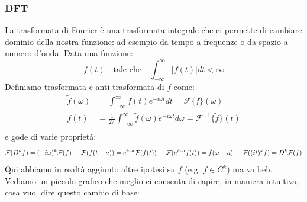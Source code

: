 \documentclass[10pt,a4paper]{article}
\begin{document}
\subsubsection{DFT}
La trasformata di Fourier è una trasformata integrale che ci  permette di cambiare dominio della nostra funzione: ad esempio da tempo a frequenze o da spazio a numero d'onda. Data una funzione:
\begin{equation}
f(t) \quad \text{tale che} \quad \int_{-\infty}^{\infty} |f(t)| dt < \infty
\end{equation}
Definiamo trasformata e anti trasformata di $f$ come:
\begin{align}
\tilde{f}(\omega) &= \int_{-\infty}^{\infty} f(t) e^{-i \omega t} dt = \mathcal{F}\{ f \}(\omega) \\
f(t) &= \frac{1}{2 \pi} \int_{-\infty}^{\infty} \tilde{f}(\omega) e^{-i \omega t} d \omega =  \mathcal{F}^{-1}\{ \tilde{f} \}(t) \\
\end{align}
e gode di varie proprietà:
\begin{equation}
\mathcal{F}(D^k f) = (-i \omega)^k \mathcal{F}(f) \hspace{5 mm}
\mathcal{F}(f(t-a))=e^{i\omega a} \mathcal{F}(f(t)) \hspace{5 mm}
\mathcal{F}(e^{i\omega a}f(t)) = \tilde{f}(\omega - a) \hspace{5 mm}
\mathcal{F}((it)^k f)=D^{k} \mathcal{F}(f)
\end{equation}
Qui abbiamo in realtà aggiunto altre ipotesi su $f$ (e.g. $f \in C^{k}$) ma va beh.
Vediamo un piccolo grafico che meglio ci consenta di capire, in maniera intuitiva, cosa vuol dire questo cambio di base:
\FloatBarrier
\end{document}
